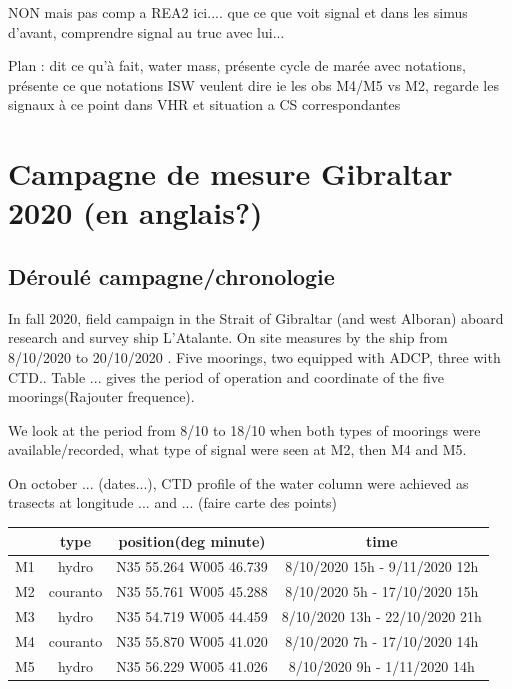 \hypersetup{pdfborder=0 0 0}

NON mais pas comp a REA2 ici.... que ce que voit signal et dans les simus d'avant, comprendre signal au truc avec lui...

Plan : dit ce qu'à fait, water mass, présente cycle de marée avec notations, présente ce que notations ISW veulent dire ie les obs M4/M5 vs M2, regarde les signaux à ce point dans VHR et situation a CS correspondantes

\section{Campagne de mesure Gibraltar 2020 (en anglais?)}


\subsection{Déroulé campagne/chronologie}
In fall 2020, field campaign in the Strait of Gibraltar (and west Alboran) aboard research and survey ship L'Atalante. On site measures by the ship from 8/10/2020 to 20/10/2020 . Five moorings, two equipped with ADCP, three with CTD.. Table ... gives the period of operation and coordinate of the five moorings(Rajouter frequence).


We look at the period from 8/10 to 18/10 when both types of moorings were available/recorded, what type of signal were seen at M2, then M4 and M5.

On october ... (dates...), CTD profile of the water column were achieved as trasects at longitude ... and ... (faire carte des points)


\begin{table}[!h]
        \centering
        \begin{tabular}{|c|c|c|c|}
                \hline
                 & type & position(deg minute) & time \\ 
                 \hline
                M1 & hydro & N35 55.264 W005 46.739 & 8/10/2020 15h - 9/11/2020 12h\\
                M2 & couranto & N35 55.761 W005 45.288 & 8/10/2020 5h - 17/10/2020 15h\\
                M3 & hydro & N35 54.719 W005 44.459 & 8/10/2020 13h - 22/10/2020 21h\\
                M4 & couranto & N35 55.870 W005 41.020 & 8/10/2020 7h - 17/10/2020 14h\\
                M5 & hydro & N35 56.229 W005 41.026 & 8/10/2020 9h - 1/11/2020 14h\\
                \hline
        \end{tabular}
\end{table}


